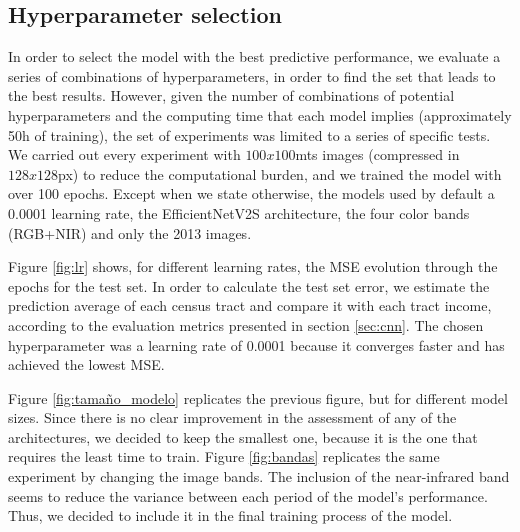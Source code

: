 \documentclass[conference]{IEEEtran}
\begin{document}

\clearpage

\newpage

\appendix

\subsection{Hyperparameter selection} \label{annex:hiperparametros} 

In order to select the model with the best predictive performance, we evaluate a series of combinations of hyperparameters, in order to find the set that leads to the best results. However, given the number of combinations of potential hyperparameters and the computing time that each model implies (approximately 50h of training), the set of experiments was limited to a series of specific tests. We carried out every experiment with $100x100$mts images (compressed in $128x128$px) to reduce the computational burden, and we trained the model with over 100 epochs. Except when we state otherwise, the models used by default a 0.0001 learning rate, the EfficientNetV2S architecture, the four color bands (RGB+NIR) and only the 2013 images.

Figure \ref{fig:lr} shows, for different learning rates, the MSE evolution through the epochs for the test set. In order to calculate the test set error, we estimate the prediction average of each census tract and compare it with each tract income, according to the evaluation metrics presented in section \ref{sec:cnn}. The chosen hyperparameter was a learning rate of 0.0001 because it converges faster and has achieved the lowest MSE.

Figure \ref{fig:tamaño_modelo} replicates the previous figure, but for different model sizes. Since there is no clear improvement in the assessment of any of the architectures, we decided to keep the smallest one, because it is the one that requires the least time to train. Figure \ref{fig:bandas} replicates the same experiment by changing the image bands. The inclusion of the near-infrared band seems to reduce the variance between each period of the model’s performance. Thus, we decided to include it in the final training process of the model.
\end{document}
